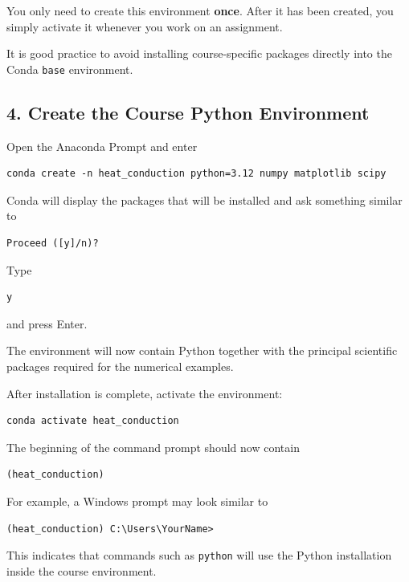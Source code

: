 \documentclass[11pt]{article}
\begin{document}
You only need to create this environment \textbf{once}. After it has
been created, you simply activate it whenever you work on an assignment.

It is good practice to avoid installing course-specific packages directly
into the Conda \texttt{base} environment.

\subsection*{4. Create the Course Python Environment}

Open the Anaconda Prompt and enter

\begin{lstlisting}
conda create -n heat_conduction python=3.12 numpy matplotlib scipy
\end{lstlisting}

Conda will display the packages that will be installed and ask something
similar to

\begin{lstlisting}
Proceed ([y]/n)?
\end{lstlisting}

Type

\begin{lstlisting}
y
\end{lstlisting}

and press Enter.

The environment will now contain Python together with the principal
scientific packages required for the numerical examples.

After installation is complete, activate the environment:

\begin{lstlisting}
conda activate heat_conduction
\end{lstlisting}

The beginning of the command prompt should now contain

\begin{lstlisting}
(heat_conduction)
\end{lstlisting}

For example, a Windows prompt may look similar to

\begin{lstlisting}
(heat_conduction) C:\Users\YourName>
\end{lstlisting}

This indicates that commands such as \texttt{python} will use the Python
installation inside the course environment.
\end{document}

